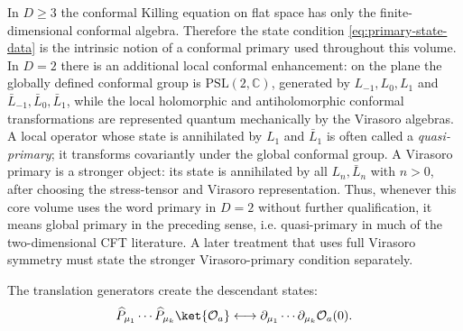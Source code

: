 \begin{remark}
\label{rem:global-primary-quasiprimary-terminology}
In \(D\ge3\) the conformal Killing equation on flat space has only the
finite-dimensional conformal algebra.  Therefore the state condition
\eqref{eq:primary-state-data} is the intrinsic notion of a conformal primary
used throughout this volume.  In \(D=2\) there is an additional local
conformal enhancement: on the plane the globally defined conformal group is
\(\mathrm{PSL}(2,\mathbb C)\), generated by
\(L_{-1},L_0,L_1\) and \(\bar L_{-1},\bar L_0,\bar L_1\), while the local
holomorphic and antiholomorphic conformal transformations are represented
quantum mechanically by the Virasoro algebras.  A local operator whose state
is annihilated by \(L_1\) and \(\bar L_1\) is often called a
\emph{quasi-primary}; it transforms covariantly under the global conformal
group.  A Virasoro primary is a stronger object: its state is annihilated by
all \(L_n,\bar L_n\) with \(n>0\), after choosing the stress-tensor and
Virasoro representation.  Thus, whenever this core volume uses the word
primary in \(D=2\) without further qualification, it means global primary in
the preceding sense, i.e. quasi-primary in much of the two-dimensional CFT
literature.  A later treatment that uses full Virasoro symmetry must state
the stronger Virasoro-primary condition separately.
\end{remark}

The translation generators create the descendant states:
\[
  \widehat P_{\mu_1}\cdots\widehat P_{\mu_k}\ket{\mathcal O_a}
  \longleftrightarrow
  \partial_{\mu_1}\cdots\partial_{\mu_k}\mathcal O_a(0).
\]

